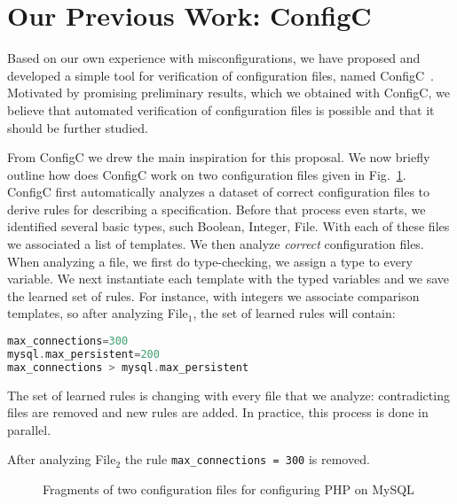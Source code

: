 \section{Our Previous Work: ConfigC}
\label{sec:prelim}

Based on our own experience with misconfigurations,
we have proposed and developed a simple tool for verification of 
configuration files, named
ConfigC~\cite{santolucitoCAV}. Motivated by promising preliminary
results, which we obtained with ConfigC, we believe that automated 
verification of configuration files is possible and that it should be further studied.

From ConfigC we drew the main inspiration for this proposal. We now briefly
outline how does ConfigC work on two configuration files given in 
Fig.~\ref{fig:twoFiles}. ConfigC first automatically
analyzes a dataset of correct configuration files to derive
 rules for describing a specification. Before that process even starts,
we identified several basic types, 
such Boolean, Integer, File. With each of these files we associated a list 
of templates. We then analyze {\emph {correct}} configuration files. When analyzing
a file, we first do type-checking, \ie we assign a type to every variable. 
We next instantiate each template with the typed variables and we save the learned set 
of rules. For instance, with integers we associate comparison templates, so after 
analyzing File$_1$, the set of learned rules will contain:
\begin{lstlisting}[language=C, xleftmargin=.01\textwidth]
max_connections=300
mysql.max_persistent=200
max_connections > mysql.max_persistent
\end{lstlisting}
The set of learned rules is changing with every file that we analyze: contradicting 
files are removed and new rules are added. In practice, this process is done 
in parallel. 

After analyzing File$_2$ the rule \texttt{max\_connections = 300} is removed. 

\begin{figure}
	\centering
\begin{minipage}{0.9\textwidth}
\begin{parcolumns}{2}


\colplacechunks
\end{parcolumns}
\end{minipage}
	\caption{Fragments of two configuration files for configuring PHP on MySQL}
	\label{fig:twoFiles}
\end{figure}


